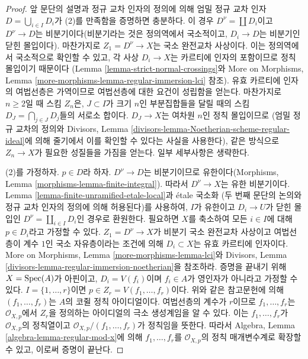 \begin{proof}
\medskip\noindent
앞 문단의 설명과 정규 교차 인자의 정의에 의해
엄밀 정규 교차 인자 $D = \bigcup_{i \in I} D_i$가 (2)를 만족함을
증명하면 충분하다. 이 경우 $D^\nu = \coprod D_i$이고
$D^\nu \to D$는 비분기이다(비분기라는 것은 정의역에서 국소적이고,
$D_i \to D$는 비분기인 닫힌 몰입이다).
마찬가지로 $Z_1 = D^\nu \to X$는 국소 완전교차 사상이다.
이는 정의역에서 국소적으로 확인할 수 있고, 각 사상
$D_i \to X$는 카르티에 인자의 포함이므로 정칙 몰입이기 때문이다
(Lemma \ref{lemma-strict-normal-crossings}와 More on Morphisms, Lemma
\ref{more-morphisms-lemma-regular-immersion-lci} 참조).
유효 카르티에 인자의 여법선층은 가역이므로 여법선층에 대한 요건이
성립함을 얻는다. 마찬가지로 $n \geq 2$일 때 스킴 $Z_n$은,
$J \subset I$가 크기 $n$인 부분집합들을 달릴 때의 스킴
$D_J = \bigcap_{j \in J} D_j$들의 서로소 합이다.
$D_J \to X$는 여차원 $n$인 정칙 몰입이므로
(엄밀 정규 교차의 정의와 Divisors, Lemma
\ref{divisors-lemma-Noetherian-scheme-regular-ideal}에 의해
줄기에서 이를 확인할 수 있다는 사실을 사용한다),
같은 방식으로 $Z_n \to X$가 필요한 성질들을 가짐을 얻는다.
일부 세부사항은 생략한다.

\medskip\noindent
(2)를 가정하자. $p \in D$라 하자. $D^\nu \to D$는 비분기이므로
유한이다(Morphisms, Lemma \ref{morphisms-lemma-finite-integral}).
따라서 $D^\nu \to X$는 유한 비분기이다.
Lemma \ref{lemma-finite-unramified-etale-local}과 \'etale 국소화
(두 번째 문단의 논의와 정규 교차 인자의 정의에 의해 허용된다)를 사용하여,
$I$가 유한이고 $D_i \to U$가 닫힌 몰입인
$D^\nu = \coprod_{i \in I} D_i$인 경우로 환원한다.
필요하면 $X$를 축소하여 모든 $i \in I$에 대해 $p \in D_i$라고
가정할 수 있다. $Z_1 =  D^\nu \to X$가 비분기 국소 완전교차 사상이고
여법선층이 계수 $1$인 국소 자유층이라는 조건에 의해
$D_i \subset X$는 유효 카르티에 인자이다. More on Morphisms, Lemma
\ref{more-morphisms-lemma-lci}와 Divisors, Lemma
\ref{divisors-lemma-regular-immersion-noetherian}을 참조하라.
증명을 끝내기 위해 $X = \mathop{\mathrm{Spec}}(A)$가 아핀이고,
$D_i = V(f_i)$이며 $f_i \in A$가 영인자가 아니라고 가정할 수 있다.
$I = \{1, \ldots, r\}$이면
$p \in Z_r = V(f_1, \ldots, f_r)$이다.
위와 같은 참고문헌에 의해 $(f_1, \ldots, f_r)$는
$A$의 코쥘 정칙 아이디얼이다. 여법선층의 계수가 $r$이므로
$f_1, \ldots, f_r$는 $\mathcal{O}_{X, p}$에서 $Z_r$을 정의하는
아이디얼의 극소 생성계임을 알 수 있다.
이는 $f_1, \ldots, f_r$가 $\mathcal{O}_{X, p}$의 정칙열이고
$\mathcal{O}_{X, p}/(f_1, \ldots, f_r)$가 정칙임을 뜻한다.
따라서 Algebra, Lemma \ref{algebra-lemma-regular-mod-x}에 의해
$f_1, \ldots, f_r$를 $\mathcal{O}_{X, p}$의 정칙 매개변수계로
확장할 수 있고, 이로써 증명이 끝난다.
\end{proof}

